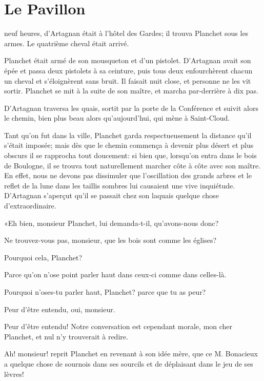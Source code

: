 
\chapter{Le Pavillon} 
	
\lettrine{}{} neuf heures, d'Artagnan était à l'hôtel des Gardes; il trouva Planchet sous les armes. Le quatrième cheval était arrivé. 

\zz
Planchet était armé de son mousqueton et d'un pistolet. D'Artagnan avait son épée et passa deux pistolets à sa ceinture, puis tous deux enfourchèrent chacun un cheval et s'éloignèrent sans bruit. Il faisait nuit close, et personne ne les vit sortir. Planchet se mit à la suite de son maître, et marcha par-derrière à dix pas. 

D'Artagnan traversa les quais, sortit par la porte de la Conférence et suivit alors le chemin, bien plus beau alors qu'aujourd'hui, qui mène à Saint-Cloud. 

Tant qu'on fut dans la ville, Planchet garda respectueusement la distance qu'il s'était imposée; mais dès que le chemin commença à devenir plus désert et plus obscurs il se rapprocha tout doucement: si bien que, lorsqu'on entra dans le bois de Boulogne, il se trouva tout naturellement marcher côte à côte avec son maître. En effet, nous ne devons pas dissimuler que l'oscillation des grands arbres et le reflet de la lune dans les taillis sombres lui causaient une vive inquiétude. D'Artagnan s'aperçut qu'il se passait chez son laquais quelque chose d'extraordinaire. 

«Eh bien, monsieur Planchet, lui demanda-t-il, qu'avons-nous donc? 

\speak  Ne trouvez-vous pas, monsieur, que les bois sont comme les églises? 

\speak  Pourquoi cela, Planchet? 

\speak  Parce qu'on n'ose point parler haut dans ceux-ci comme dans celles-là. 

\speak  Pourquoi n'oses-tu parler haut, Planchet? parce que tu as peur? 

\speak  Peur d'être entendu, oui, monsieur. 

\speak  Peur d'être entendu! Notre conversation est cependant morale, mon cher Planchet, et nul n'y trouverait à redire. 

\speak  Ah! monsieur! reprit Planchet en revenant à son idée mère, que ce M. Bonacieux a quelque chose de sournois dans ses sourcils et de déplaisant dans le jeu de ses lèvres! 

